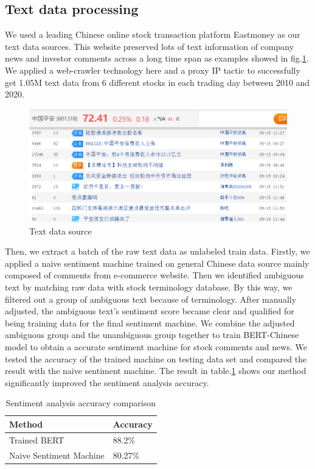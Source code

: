 \documentclass[runningheads]{llncs}
\begin{document}
\subsection{Text data processing}

We used a leading Chinese online stock transaction platform Eastmoney as our text data sources. This website preserved lots of text information of company news and investor comments across a long time span as examples showed in fig.\ref{fig:eastmoney}. We applied a web-crawler technology here and a proxy IP tactic to successfully get 1.05M text data from 6 different stocks in each trading day between 2010 and 2020.
\begin{figure}
\includegraphics[width=\textwidth]{pingacomment.png}
\caption{Text data source} \label{fig:eastmoney}
\end{figure}
Then, we extract a batch of the raw text data as unlabeled train data. Firstly, we applied a naive sentiment machine trained on general Chinese data source mainly composed of comments from e-commerce website. Then we identified ambiguous text by matching raw data with stock terminology database. By this way, we filtered out a group of ambiguous text because of terminology. After manually adjusted, the ambiguous text's sentiment score became clear and qualified for being training data for the final sentiment machine. We combine the adjusted ambiguous group and the unambiguous group together to train BERT-Chinese model to obtain a accurate sentiment machine for stock comments and news. We tested the accuracy of the trained machine on testing data set and compared the result with the naive sentiment machine. The result in table.\ref{tab:sentimentcomps} shows our method significantly improved the sentiment analysis accuracy.
\begin{table}
    \centering\caption{Sentiment analysis accuracy comparison}\label{tab:sentimentcomps}
    \begin{tabular}{|l|l|}
        \hline
        Method &  Accuracy\\
        \hline
        Trained BERT & 88.2\%\\
        Naive Sentiment Machine & 80.27\%\\
        \hline
    \end{tabular}
\end{table}
\end{document}
